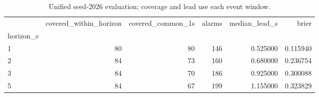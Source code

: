 \begin{table}
\caption{Unified seed-2026 evaluation; coverage and lead use each event window.}
\begin{tabular}{lrrrrr}
\toprule
 & covered_within_horizon & covered_common_1s & alarms & median_lead_s & brier \\
horizon_s &  &  &  &  &  \\
\midrule
1 & 80 & 80 & 146 & 0.525000 & 0.115940 \\
2 & 84 & 73 & 160 & 0.680000 & 0.236754 \\
3 & 84 & 70 & 186 & 0.925000 & 0.300088 \\
5 & 84 & 67 & 199 & 1.155000 & 0.323829 \\
\bottomrule
\end{tabular}
\end{table}
